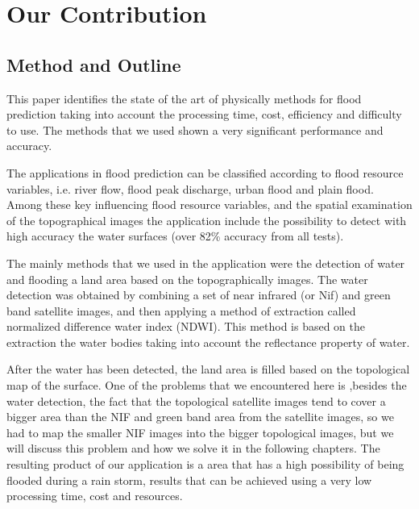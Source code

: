 \documentclass[12pt, a4paper]{report}
\begin{document}
\section{Our Contribution}
\subsection{Method and Outline}

This paper identifies the state of the art of physically methods for flood prediction taking into account the processing time, cost, efficiency and difficulty to use. The methods that we used shown a very significant performance and accuracy.
\par

The applications in flood prediction can be classified according to flood resource variables, i.e. river flow, flood peak discharge, urban flood and plain flood. Among these key influencing flood resource variables, and the spatial examination of the topographical images the application include the possibility to detect with high accuracy the water surfaces (over 82\% accuracy from all tests).
\par

The mainly methods that we used in the application were the detection of water and flooding a land area based on the topographically images. The water detection was obtained by combining a set of near infrared (or Nif) and green band satellite images, and then applying a method of extraction called normalized difference water index (NDWI). This method is based on the extraction the water bodies taking into account the reflectance property of water.
\par 

After the water has been detected, the land area is filled based on the topological map of the surface. One of the problems that we encountered here is ,besides the water detection, the fact that the topological satellite images tend to cover a bigger area than the NIF and green band area from the satellite images, so we had to map the smaller NIF images into the bigger topological images, but we will discuss this problem and how we solve it in the following chapters. The resulting product of our application is a area that has a high possibility of being flooded during a rain storm, results that can be achieved using a very low processing time, cost and resources.
\par 
\end{document}
